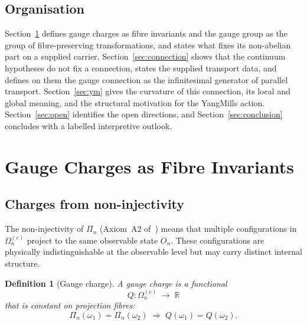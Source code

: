 \documentclass[11pt,a4paper]{article}
\newtheorem{definition}[theorem]{Definition}
\begin{document}
  \subsection*{Organisation}

    Section~\ref{sec:charges} defines gauge charges as fibre invariants and the gauge group as
    the group of fibre-preserving transformations, and states what fixes its non-abelian part
    on a supplied carrier.
    Section~\ref{sec:connection} shows that the continuum hypotheses do not fix a connection, states
    the supplied transport data, and defines on them the gauge connection as the infinitesimal
    generator of parallel transport.
    Section~\ref{sec:ym} gives the curvature of this connection, its local and global meaning, and
    the structural motivation for the Yang\textendash Mills action.
    Section~\ref{sec:open} identifies the open directions, and Section~\ref{sec:conclusion}
    concludes with a labelled interpretive outlook.

    \clearpage
  \section{Gauge Charges as Fibre Invariants}
  \label{sec:charges}

  \subsection{Charges from non-injectivity}

    The non-injectivity of $\Pi_n$ (Axiom~A2 of~\cite{Beau2026m}) means that
    multiple configurations in $\Omega_n^{(c)}$ project to the same observable
    state $O_n$.
    These configurations are physically indistinguishable at the observable level
    but may carry distinct internal structure.

    \begin{definition}[Gauge charge]
      \label{def:gauge-charge}
      A \emph{gauge charge} is a functional
      \begin{equation}
        Q : \Omega_n^{(c)} \;\longrightarrow\; \mathbb{R}
      \end{equation}
      that is constant on projection fibres:
      \begin{equation}
        \Pi_n(\omega_1) = \Pi_n(\omega_2)
        \;\Longrightarrow\;
        Q(\omega_1) = Q(\omega_2).
      \end{equation}
    \end{definition}
\end{document}

